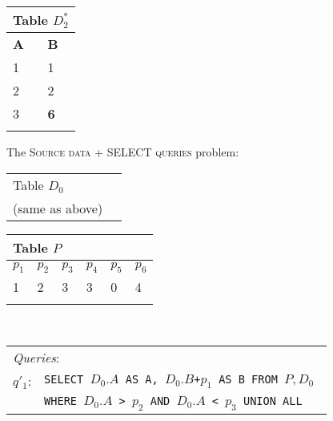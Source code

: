 \begin{figure}[t]
\begin{minipage}[t]{0.16\textwidth}
         \centering
        \begin{tabular}{ll}
            \multicolumn{2}{l}{Table $D_2^*$}\\
            \toprule
            \textbf{A}  & \textbf{B}\\
            \midrule
			 1 & 1 \\
			 2 & 2 \\
			 3 & {\textbf{6}} \\
            \bottomrule
            \\
        \end{tabular}
    \end{minipage}
The \textsc{Source data + SELECT queries} problem: \\
\begin{minipage}[t]{0.1\textwidth}
         \vspace{0pt} 
         \centering
        \begin{tabular}{ll}
            \multicolumn{2}{l}{Table $D_0$}\\
            (same as above) \\
        \end{tabular}
    \end{minipage}
\begin{minipage}[t]{0.36\textwidth}
         \vspace{0pt} 
         \centering
        \begin{tabular}{llllll}
            \multicolumn{6}{l}{Table $P$}\\
            \toprule
            \textbf{$p_1$}  & \textbf{$p_2$} & \textbf{$p_3$} & \textbf{$p_4$}  & \textbf{$p_5$} & \textbf{$p_6$} \\
            \midrule
			 1 & 2 & 3 & 3 & 0 & 4\\
            \bottomrule
            \\
        \end{tabular}
    \end{minipage}\\
        \begin{minipage}[t]{0.22\textwidth}
         \vspace{0pt} 
         \centering
        \begin{tabular}{p{2ex}p{55ex}}
         \multicolumn{2}{l}{\emph{Queries}: }\\
        $q'_1$: &
        \texttt{\small SELECT $D_0.A$ AS A, $D_0.B$+$p_1$ AS B FROM $P, D_0$ } \\
        & \texttt{\small WHERE $D_0.A$ > $p_2$ AND $D_0.A$ < $p_3$ UNION ALL}\\

\end{tabular}
\end{minipage}
\end{figure}
